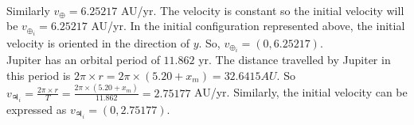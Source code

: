 \documentclass[a4paper, twoside, 11pt]{report}
\theoremstyle{theorem}
\theoremstyle{remark}
\theoremstyle{exemple}
\begin{document}
            \paragraph{}Similarly $v_{\oplus} = 6.25217$ AU/yr. The velocity is constant so the initial velocity will be $v_{\oplus_i}=6.25217$ AU/yr. In the initial configuration represented above, the initial velocity is oriented in the direction of $y$. So, $v_{\oplus_i} = \left(0, 6.25217\right)$. \\
            Jupiter has an orbital period of $11.862$ yr. The distance travelled by Jupiter in this period is $2 \pi \times r = 2 \pi \times (5.20 + x_m) = 32.6415 AU$. So $v_{\jupiter_i}= \frac{2 \pi \times r}{T} = \frac{2 \pi \times (5.20+x_m)}{11.862} = 2.75177 $ AU/yr. Similarly, the initial velocity can be expressed as $v_{\jupiter_i} = \left(0, 2.75177\right)$.
            
\end{document}
